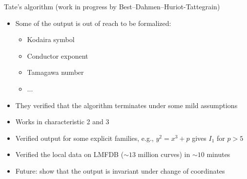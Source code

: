 \documentclass[11pt, aspectratio=169]{beamer}
\begin{document}
\begin{frame}{ Tate's algorithm (work in progress by Best--Dahmen--Huriot-Tattegrain)}
    \begin{itemize}
        \item Some of the output is out of reach to be formalized:
            \begin{itemize}
                \item Kodaira symbol
                \item Conductor exponent
                \item Tamagawa number
                \item ...
            \end{itemize}
        \item They verified that the algorithm terminates under some mild assumptions
        \item Works in characteristic 2 and 3
        \item Verified output for some explicit families, e.g., $y^2 = x^3 + p$ gives $I_1$ for $p >5$
        \item Verified the local data on LMFDB ($\sim\!13$ million curves) in $\sim\!10$ minutes
        \item Future: show that the output is invariant under change of coordinates
    \end{itemize}
\end{frame}
\end{document}

